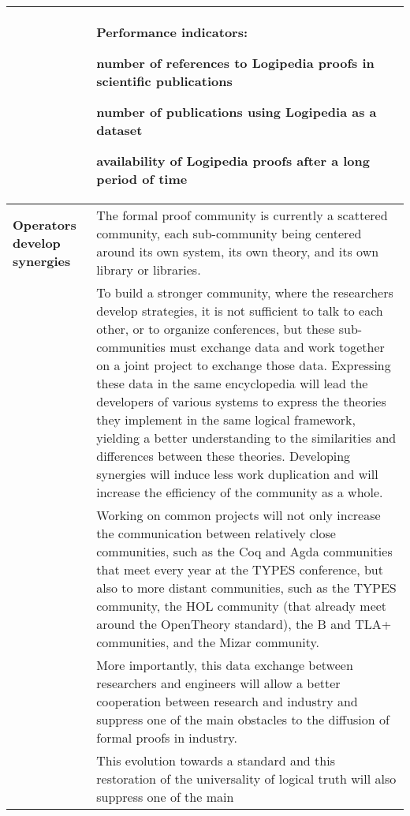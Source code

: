 \begin{longtable}{|p{}|p{}|}
\\
&
\colorbox{color3}{\bf Performance indicators:}
\begin{compactitem}
\item number of references to Logipedia proofs in scientific publications
\item number of publications using Logipedia as a dataset
\item availability of Logipedia proofs after a long period of time
\end{compactitem}
\\
\hline
{\bf Operators develop synergies}
&
The formal proof community is currently a scattered community, each
sub-community being centered around its own system, its own theory,
and its own library or libraries.\\
&
\hspace{0.4cm}
To build a stronger community, where the researchers develop
strategies, it is not sufficient to talk to each other, or to organize
conferences, but these sub-communities must exchange data and work
together on a joint project to exchange those data.  Expressing these
data in the same encyclopedia will lead the developers of various
systems to express the theories they implement in the same logical
framework, yielding a better understanding to the similarities and
differences between these theories.  Developing synergies will induce
less work duplication and will increase the efficiency of the
community as a whole.
\\
&
\hspace{0.4cm}
Working on common projects will not only increase the communication
between relatively close communities, such as the Coq and
  Agda communities that meet every year at the TYPES conference, but
also to more distant communities, such as the TYPES community, the HOL
community (that already meet around the OpenTheory standard),
the B and TLA+ communities, and the Mizar community.\\
&
\hspace{0.4cm}
More importantly, this data exchange between researchers and engineers
will allow a better cooperation between research and industry and
suppress one of the main obstacles to the diffusion of formal proofs
in industry.\\
&
\hspace{0.4cm}
This evolution towards a standard and this restoration of the
universality of logical truth will also suppress one of the main

\end{longtable}
